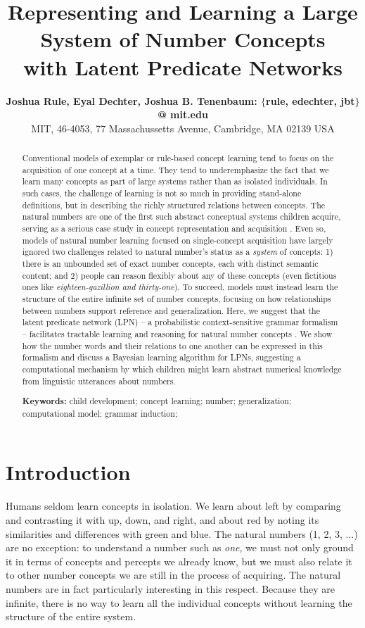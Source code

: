\documentclass[10pt,letterpaper]{article}
\title{Representing and Learning a Large System of Number Concepts\\with Latent Predicate Networks}
\author{
  {\large \bf Joshua Rule, Eyal Dechter, Joshua B. Tenenbaum: $\{$rule, edechter, jbt$\}$ @ mit.edu}\\
  MIT, 46-4053, 77 Massachussetts Avenue, Cambridge, MA 02139 USA}
\begin{document}
\maketitle

\begin{abstract}
  Conventional models of exemplar or rule-based concept learning tend
  to focus on the acquisition of one concept at a time. They tend to
  underemphasize the fact that we learn many concepts as part of large
  systems rather than as isolated individuals. In such cases, the
  challenge of learning is not so much in providing stand-alone
  definitions, but in describing the richly structured relations
  between concepts. The natural numbers are one of the first such
  abstract conceptual systems children acquire, serving as a serious
  case study in concept representation and acquisition
  \citep{fuson1988children,galGel2005,Car2009}. Even so, models of
  natural number learning focused on single-concept acquisition have
  largely ignored two challenges related to natural number's status as
  a \emph{system} of concepts: 1) there is an unbounded set of exact
  number concepts, each with distinct semantic content; and 2) people
  can reason flexibly about any of these concepts (even fictitious
  ones like \emph{eighteen-gazillion and thirty-one}). To succeed,
  models must instead learn the structure of the entire infinite set
  of number concepts, focusing on how relationships between numbers
  support reference and generalization.  Here, we suggest that the
  latent predicate network (LPN) -- a probabilistic context-sensitive
  grammar formalism -- facilitates tractable learning and reasoning
  for natural number concepts \citep{DecRulTen2015}. We show how the
  number words and their relations to one another can be expressed in
  this formalism and discuss a Bayesian learning algorithm for LPNs,
  suggesting a computational mechanism by which children might learn
  abstract numerical knowledge from linguistic utterances about
  numbers.

  \textbf{Keywords:}
  child development; concept learning; number; generalization;
  computational model; grammar induction;
\end{abstract}

\section{Introduction}

Humans seldom learn concepts in isolation. We learn about left by
comparing and contrasting it with up, down, and right, and about red
by noting its similarities and differences with green and blue. The
natural numbers (1, 2, 3, $\ldots$) are no exception: to understand a
number such as \emph{one}, we must not only ground it in terms of
concepts and percepts we already know, but we must also relate it to
other number concepts we are still in the process of acquiring. The
natural numbers are in fact particularly interesting in this respect.
Because they are infinite, there is no way to learn all the individual
concepts without learning the structure of the entire system.
\end{document}
